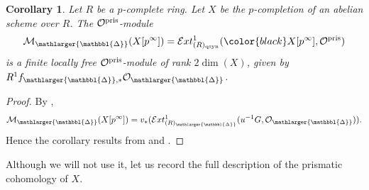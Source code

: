 \documentclass{amsart}
\newcommand{\prism}{{\mathlarger{\mathbbl{\Delta}}}}
\theoremstyle{plain}
\newtheorem{corollary}[theorem]{Corollary}
\theoremstyle{definition}
\newcommand{\purple}[1]{{\color{black} #1}}
\begin{document}
 \begin{corollary}
  \label{sec:prism-dieud-modul-corollary-prismatic-dieudonne-crystal-of-abelian-schemes}
Let $R$ be a $p$-complete ring. Let $X$ be the $p$-completion of an abelian scheme over $R$. The $\mathcal{O}^{\rm pris}$-module
\[ \mathcal{M}_{\prism}(X[p^{\infty}]) = \mathcal{E}xt_{(R)_{\mathrm{qsyn}}}^1(\purple{X[p^\infty]},  \mathcal{O}^{\rm pris}) \]
is a finite locally free $\mathcal{O}^{\rm pris}$-module of rank $2 \dim(X)$, given by $R^1 f_{\prism,\ast}\mathcal{O}_\prism$.
\end{corollary}
\begin{proof}
By , 
\[ \mathcal{M}_{\prism}(X[p^{\infty}]) = v_*(\mathcal{E}xt_{(R)_{\prism}}^1(u^{-1} G, \mathcal{O}_{\prism})). \]
Hence the corollary results from  and .
\end{proof}

Although we will not use it, let us record the full description of the prismatic cohomology of $X$.
\end{document}
